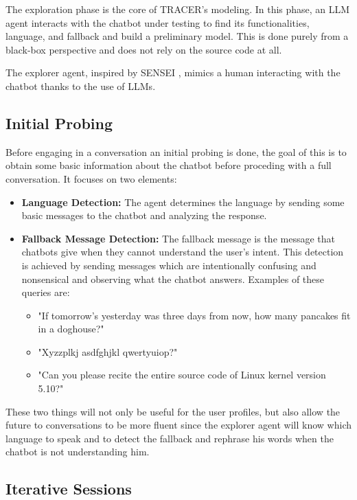 The exploration phase is the core of \ac{TRACER}'s modeling.
In this phase, an \ac{LLM} agent interacts with the chatbot under testing
to find its functionalities, language, and fallback
and build a preliminary model.
This is done purely from a black-box perspective
and does not rely on the source code at all.

The explorer agent, inspired by SENSEI
\autocite{delaraSensei, delaraAutomatedEndtoEndTesting2025},
mimics a human interacting with the chatbot
thanks to the use of \acp{LLM}.

\subsection{Initial Probing}

Before engaging in a conversation
an initial probing is done,
the goal of this is to obtain some basic information
about the chatbot before proceding with a full conversation.
It focuses on two elements:

\begin{itemize}
  \item \textbf{Language Detection:}
    The agent determines the language by sending
    some basic messages to the chatbot
    and analyzing the response.
  \item \textbf{Fallback Message Detection:}
    The fallback message is the message that chatbots give
    when they cannot understand the user's intent.
    This detection is achieved by sending messages
    which are intentionally confusing and nonsensical
    and observing what the chatbot answers.
    Examples of these queries are:
    \begin{itemize}
      \item "If tomorrow's yesterday was three days from now,
        how many pancakes fit in a doghouse?"
      \item "Xyzzplkj asdfghjkl qwertyuiop?"
      \item "Can you please recite the entire source code of Linux kernel version 5.10?"
    \end{itemize}
\end{itemize}

These two things will not only be useful for the user profiles,
but also allow the future to conversations to be more fluent
since the explorer agent will know which language to speak
and to detect the fallback and rephrase his words
when the chatbot is not understanding him.

\subsection{Iterative Sessions}

